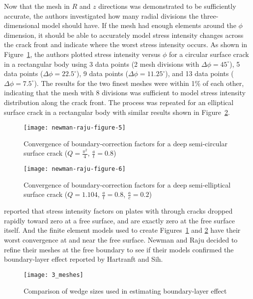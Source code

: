 Now that the mesh in $R$ and $z$ directions was demonstrated to be sufficiently accurate, the authors investigated how many radial divisions the three-dimensional model should have. If the mesh had enough elements around the $\phi$ dimension, it should be able to accurately model stress intensity changes across the crack front and indicate where the worst stress intensity occurs.
As shown in Figure~\ref{fig:circular_convergence}, the authors plotted stress intensity versus $\phi$ for a circular surface crack in a rectangular body using 3 data points (2 mesh divisions with $\Delta \phi=45^\circ$), 5 data points ($\Delta \phi=22.5^\circ$), 9 data points ($\Delta \phi=11.25^\circ$), and 13 data points ($\Delta \phi=7.5^\circ$). The results for the two finest meshes were within 1\% of each other, indicating that the mesh with 8 divisions was sufficient to model stress intensity distribution along the crack front. The process was repeated for an elliptical surface crack in a rectangular body with similar results shown in Figure~\ref{fig:elliptical_convergence}.
\begin{figure}[tbp]
\centering
	   \texttt{[image: newman-raju-figure-5]}
      \caption[Convergence of bound\-ary-cor\-rec\-tion factors for a deep semi-circu\-lar surface crack ($Q=\frac{\pi^2}{4}$, $\frac{a}{t}=0.8$)]{Convergence of bound\-ary-cor\-rec\-tion factors for a deep semi-circu\-lar surface crack ($Q=\frac{\pi^2}{4}$, $\frac{a}{t}=0.8$) \citep{rajunewman1979}}
      \label{fig:circular_convergence}
\end{figure}

\begin{figure}[tbp]
\centering
	   \texttt{[image: newman-raju-figure-6]}
      \caption[Convergence of bound\-ary-cor\-rec\-tion factors for a deep semi-ellip\-tical surface crack ($Q=1.104$, $\frac{a}{t}=0.8$, $\frac{a}{c}=0.2$)]{Convergence of bound\-ary-cor\-rec\-tion factors for a deep semi-ellip\-tical surface crack ($Q=1.104$, $\frac{a}{t}=0.8$, $\frac{a}{c}=0.2$) \citep{rajunewman1979}}
      \label{fig:elliptical_convergence}
\end{figure}

\citet{hartranftsih1970} reported that stress intensity factors on plates with through cracks dropped rapidly toward zero at a free surface, and are exactly zero at the free surface itself.
And the finite element models used to create Figures~\ref{fig:circular_convergence} and \ref{fig:elliptical_convergence} have their worst convergence at and near the free surface.
Newman and Raju decided to refine their meshes at the free boundary to see if their models confirmed the bound\-ary-layer effect reported by Hartranft and Sih.
\begin{figure}[tbp]
\centering
	   \texttt{[image: 3\_meshes]}
      \caption{Comparison of wedge sizes used in estimating bound\-ary-layer effect}
      \label{fig:wedge_refinement}
\end{figure}

